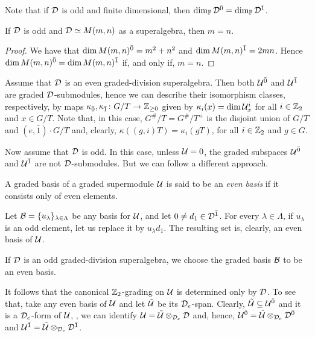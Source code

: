 Note that if $\mathcal{D}$ is odd and finite dimensional, then $\dim_{\mathbb{F}} \mathcal{D}^{\bar0} = \dim_{\mathbb{F}} \mathcal{D}^{\bar1}$. 

\begin{lemma}\label{lemma:odd-M-m=n}
    If $\mathcal{D}$ is odd and $\mathcal{D} \simeq M(m,n)$ as a superalgebra, then $m = n$. 
\end{lemma}

\begin{proof}
    We have that $\dim M(m,n)^{\bar0} = m^2 + n^2$ and $\dim M(m,n)^{\bar1} = 2mn$. 
    Hence $\dim M(m,n)^{\bar0} = \dim M(m,n)^{\bar1}$ if, and only if, $m=n$. 
\end{proof}

Assume that $\mathcal{D}$ is an even graded-division superalgebra. 
Then both $\mathcal U^{\bar0}$ and $\mathcal U^{\bar1}$ are graded $\mathcal{D}$-submodules, hence we can describe their isomorphism classes, respectively, by maps $\kappa_{\bar{0}}, \kappa_{\bar{1}}\colon G/T \to \mathbb{Z}_{\geq 0}$ given by $\kappa_i (x) = \dim \mathcal U^i_x$ for all $i\in \mathbb{Z}_2$ and $x\in G/T$. 
Note that, in this case, $G^\#/T = G^\#/T^+$ is the disjoint union of $G/T$ and $(e, \bar 1) \cdot G/T$ and, clearly, $\kappa ((g,i)T) = \kappa_i (gT)$, for all $i\in \mathbb{Z}_2$ and $g\in G$. 

Now assume that $\mathcal{D}$ is odd. 
In this case, unless $\mathcal U = 0$, the graded subspaces $\mathcal U^{\bar0}$ and $\mathcal U^{\bar1}$ are not $\mathcal{D}$-submodules. 
But we can follow a different approach.

\begin{defi}
    A graded basis of a graded supermodule $\mathcal U$ is said to be an \emph{even basis} if it consists only of even elements.
\end{defi}

Let $\mathcal B = \{u_\lambda\}_{\lambda \in \Lambda}$ be any basis for $\mathcal U$, and let $0 \neq d_1\in \mathcal{D}^{\bar1}$. 
For every $\lambda \in \Lambda$, if $u_\lambda$ is an odd element, let us replace it by $u_\lambda d_1$. 
The resulting set is, clearly, an even basis of $\mathcal U$. 

\begin{convention}\label{conv:pick-even-basis}
    If $\mathcal{D}$ is an odd graded-division superalgebra, we choose the graded basis $\mathcal B$ to be an even basis.
\end{convention}

It follows that the canonical $\mathbb{Z}_2$-grading on $\mathcal U$ is determined only by $\mathcal{D}$. 
To see that, take any even basis of $\mathcal U$ and let $\tilde {\mathcal U}$ be its $\mathcal{D}_e$-span. 
Clearly, $\tilde {\mathcal U} \subseteq \mathcal U^{\bar0}$ and it is a  $\mathcal{D}_e$-form of $\mathcal U$, \ie, we can identify $\mathcal U = \tilde{\mathcal U} \otimes_{\mathcal{D}_e} \mathcal{D}$ and, hence, $\mathcal U^{\bar0} = \tilde{\mathcal U} \otimes_{\mathcal{D}_e} \mathcal{D}^{\bar0}$ and  $\mathcal U^{\bar1} = \tilde{\mathcal U} \otimes_{\mathcal{D}_e} \mathcal{D}^{\bar1}$. 

